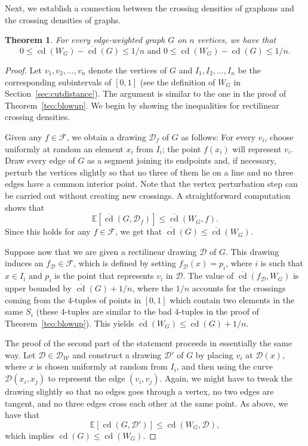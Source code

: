 \documentclass{article}
\newcounter{contSect} \numberwithin{contSect}{section}
\newtheorem{theorem}[contSect]{Theorem}
\begin{document}
Next, we establish a connection between the crossing densities of graphons and the crossing densities of graphs.

\begin{theorem}\label{teo:G_W}
For every edge-weighted graph $G$ on $n$ vertices, we have that \[0\leq\overline{\mathop{\mathrm{cd}}}(W_G)-\overline{\mathop{\mathrm{cd}}}(G)\leq 1/n\text{ and } 0\leq\mathop{\mathrm{cd}}(W_G)-\mathop{\mathrm{cd}}(G)\leq 1/n.\]   
\end{theorem}

\begin{proof}
    Let $v_1,v_2,\dots,v_n$ denote the vertices of $G$ and $I_1,I_2,\dots,I_n$ be the corresponding subintervals of $[0,1]$ (see the definition of $W_G$ in Section~\ref{sec:cutdistance}). The argument is similar to the one in the proof of Theorem~\ref{teo:blowup}. We begin by showing the inequalities for rectilinear crossing densities.
  
    Given any $f\in\mathcal{F}$, we obtain a drawing $\mathcal{D}_f$ of $G$ as follows: For every $v_i$, choose uniformly at random an element $x_i$ from $I_i$; the point $f(x_i)$ will represent $v_i$. Draw every edge of $G$ as a segment joining its endpoints and, if necessary, perturb the vertices slightly so that no three of them lie on a line and no three edges have a common interior point. Note that the vertex perturbation step can be carried out without creating new crossings. A straightforward computation shows that \[\mathbb{E}[\overline{\mathop{\mathrm{cd}}}(G,\mathcal{D}_f)]\leq\overline{\mathop{\mathrm{cd}}}(W_G,f).\] Since this holds for any $f\in\mathcal{F}$, we get that $\overline{\mathop{\mathrm{cd}}}(G)\leq\overline{\mathop{\mathrm{cd}}}(W_G)$.
    
    Suppose now that we are given a rectilinear drawing $\mathcal{D}$ of $G$. This drawing induces an $f_\mathcal{D}\in\mathcal{F}$, which is defined by setting $f_\mathcal{D}(x)=p_i$, where $i$ is such that $x\in I_i$ and $p_i$ is the point that represents $v_i$ in $\mathcal{D}$. The value of $\overline{\mathop{\mathrm{cd}}}(f_\mathcal{D},W_G)$ is upper bounded by $\overline{\mathop{\mathrm{cd}}}(G)+1/n$, where the $1/n$ accounts for the crossings coming from the $4$-tuples of points in $[0,1]$ which contain two elements in the same $S_i$ (these $4$-tuples are similar to the bad $4$-tuples in the proof of Theorem~\ref{teo:blowup}). This yields $\overline{\mathop{\mathrm{cd}}}(W_G)\leq\overline{\mathop{\mathrm{cd}}}(G)+1/n$.

    The proof of the second part of the statement proceeds in essentially the same way. Let $\mathcal{D}\in\mathcal{D}_\mathcal{W}$ and construct a drawing $\mathcal{D}'$ of $G$ by placing $v_i$ at $\mathcal{D}(x)$, where $x$ is chosen uniformly at random from $I_i$, and then using the curve $\mathcal{D}(x_i,x_j)$ to represent the edge $(v_i,v_j)$. Again, we might have to tweak the drawing slightly so that no edges goes through a vertex, no two edges are tangent, and no three edges cross each other at the same point. As above, we have that \[\mathbb{E}[\mathop{\mathrm{cd}}(G,\mathcal{D}')]\leq\mathop{\mathrm{cd}}(W_G,\mathcal{D}),\] which implies $\mathop{\mathrm{cd}}(G)\leq\mathop{\mathrm{cd}}(W_G)$.


\end{proof}
\end{document}
